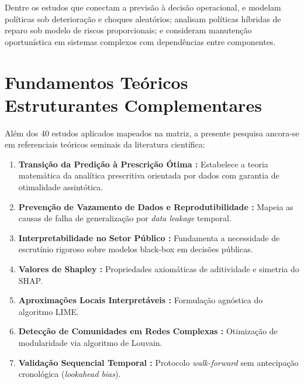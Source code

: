 Dentre os estudos que conectam a previsão à decisão operacional,  e  modelam políticas sob deterioração e choques aleatórios;  analisam políticas híbridas de reparo sob modelo de riscos proporcionais; e  consideram manutenção oportunística em sistemas complexos com dependências entre componentes.

\section{Fundamentos Teóricos Estruturantes Complementares}

Além dos 40 estudos aplicados mapeados na matriz, a presente pesquisa ancora-se em referenciais teóricos seminais da literatura científica:
\begin{enumerate}
    \item \textbf{Transição da Predição à Prescrição Ótima \cite{bertsimas2020}:} Estabelece a teoria matemática da analítica prescritiva orientada por dados com garantia de otimalidade assintótica.
    \item \textbf{Prevenção de Vazamento de Dados e Reprodutibilidade \cite{kapoor2023}:} Mapeia as causas de falha de generalização por \textit{data leakage} temporal.
    \item \textbf{Interpretabilidade no Setor Público \cite{rudin2019}:} Fundamenta a necessidade de escrutínio rigoroso sobre modelos black-box em decisões públicas.
    \item \textbf{Valores de Shapley \cite{lundberg2017}:} Propriedades axiomáticas de aditividade e simetria do SHAP.
    \item \textbf{Aproximações Locais Interpretáveis \cite{ribeiro2016}:} Formulação agnóstica do algoritmo LIME.
    \item \textbf{Detecção de Comunidades em Redes Complexas \cite{blondel2008}:} Otimização de modularidade via algoritmo de Louvain.
    \item \textbf{Validação Sequencial Temporal \cite{bergmeir2012}:} Protocolo \textit{walk-forward} sem antecipação cronológica (\textit{lookahead bias}).
\end{enumerate}
